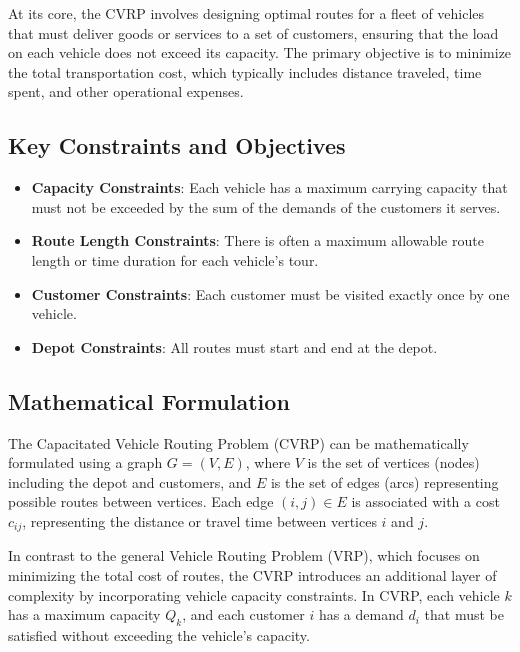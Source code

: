 \documentclass[
]{article}
\begin{document}
    At its core, the CVRP involves designing optimal routes for a fleet of vehicles that must deliver goods or services to a set of customers, ensuring that the load on each vehicle does not exceed its capacity. The primary objective is to minimize the total transportation cost, which typically includes distance traveled, time spent, and other operational expenses.

    \subsection{Key Constraints and Objectives}\label{subsec:key-constraints-and-objectives}

    \begin{itemize}
        \item \textbf{Capacity Constraints}: Each vehicle has a maximum carrying capacity that must not be exceeded by the sum of the demands of the customers it serves.
        \item \textbf{Route Length Constraints}: There is often a maximum allowable route length or time duration for each vehicle’s tour.
        \item \textbf{Customer Constraints}: Each customer must be visited exactly once by one vehicle.
        \item \textbf{Depot Constraints}: All routes must start and end at the depot.
    \end{itemize}

    \subsection{Mathematical Formulation}\label{subsec:mathematical-formulation}

    The Capacitated Vehicle Routing Problem (CVRP) can be mathematically formulated using a graph $G = (V, E)$, where $V$ is the set of vertices (nodes) including the depot and customers, and $E$ is the set of edges (arcs) representing possible routes between vertices. Each edge $(i, j) \in E$ is associated with a cost $c_{ij}$, representing the distance or travel time between vertices $i$ and $j$.

    In contrast to the general Vehicle Routing Problem (VRP), which focuses on minimizing the total cost of routes, the CVRP introduces an additional layer of complexity by incorporating vehicle capacity constraints. In CVRP, each vehicle $k$ has a maximum capacity $Q_k$, and each customer $i$ has a demand $d_i$ that must be satisfied without exceeding the vehicle's capacity.
\end{document}
